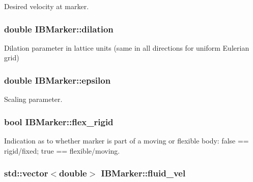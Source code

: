 Desired velocity at marker. 

\subsubsection[{\texorpdfstring{dilation}{dilation}}]{\setlength{\rightskip}{0pt plus 5cm}double I\+B\+Marker\+::dilation\hspace{0.3cm}{\ttfamily [protected]}}\hypertarget{class_i_b_marker_a5c908a7e52fc0b2dccbaa277f37b7c22}{}\label{class_i_b_marker_a5c908a7e52fc0b2dccbaa277f37b7c22}


Dilation parameter in lattice units (same in all directions for uniform Eulerian grid) 

\subsubsection[{\texorpdfstring{epsilon}{epsilon}}]{\setlength{\rightskip}{0pt plus 5cm}double I\+B\+Marker\+::epsilon\hspace{0.3cm}{\ttfamily [protected]}}\hypertarget{class_i_b_marker_a8127c61f723299ba0bf04439c1fb1c1e}{}\label{class_i_b_marker_a8127c61f723299ba0bf04439c1fb1c1e}


Scaling parameter. 

\subsubsection[{\texorpdfstring{flex\+\_\+rigid}{flex_rigid}}]{\setlength{\rightskip}{0pt plus 5cm}bool I\+B\+Marker\+::flex\+\_\+rigid\hspace{0.3cm}{\ttfamily [protected]}}\hypertarget{class_i_b_marker_a826fd907814ce9c6e40bcbdbd359ec7e}{}\label{class_i_b_marker_a826fd907814ce9c6e40bcbdbd359ec7e}


Indication as to whether marker is part of a moving or flexible body\+: false == rigid/fixed; true == flexible/moving. 

\subsubsection[{\texorpdfstring{fluid\+\_\+vel}{fluid_vel}}]{\setlength{\rightskip}{0pt plus 5cm}std\+::vector$<$double$>$ I\+B\+Marker\+::fluid\+\_\+vel\hspace{0.3cm}{\ttfamily [protected]}}\hypertarget{class_i_b_marker_aa31ccf45de61bfccc60876ac9e98909a}{}\label{class_i_b_marker_aa31ccf45de61bfccc60876ac9e98909a}


